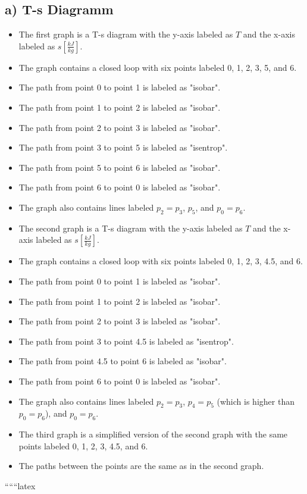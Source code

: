 \subsection*{a) T-s Diagramm}

\begin{itemize}
    \item The first graph is a T-s diagram with the y-axis labeled as \( T \) and the x-axis labeled as \( s \left[ \frac{kJ}{kg} \right] \). 
    \item The graph contains a closed loop with six points labeled 0, 1, 2, 3, 5, and 6.
    \item The path from point 0 to point 1 is labeled as "isobar".
    \item The path from point 1 to point 2 is labeled as "isobar".
    \item The path from point 2 to point 3 is labeled as "isobar".
    \item The path from point 3 to point 5 is labeled as "isentrop".
    \item The path from point 5 to point 6 is labeled as "isobar".
    \item The path from point 6 to point 0 is labeled as "isobar".
    \item The graph also contains lines labeled \( p_2 = p_3 \), \( p_5 \), and \( p_0 = p_6 \).
\end{itemize}

\begin{itemize}
    \item The second graph is a T-s diagram with the y-axis labeled as \( T \) and the x-axis labeled as \( s \left[ \frac{kJ}{kg} \right] \). 
    \item The graph contains a closed loop with six points labeled 0, 1, 2, 3, 4.5, and 6.
    \item The path from point 0 to point 1 is labeled as "isobar".
    \item The path from point 1 to point 2 is labeled as "isobar".
    \item The path from point 2 to point 3 is labeled as "isobar".
    \item The path from point 3 to point 4.5 is labeled as "isentrop".
    \item The path from point 4.5 to point 6 is labeled as "isobar".
    \item The path from point 6 to point 0 is labeled as "isobar".
    \item The graph also contains lines labeled \( p_2 = p_3 \), \( p_4 = p_5 \) (which is higher than \( p_0 = p_6 \)), and \( p_0 = p_6 \).
\end{itemize}

\begin{itemize}
    \item The third graph is a simplified version of the second graph with the same points labeled 0, 1, 2, 3, 4.5, and 6.
    \item The paths between the points are the same as in the second graph.
\end{itemize}

``````latex